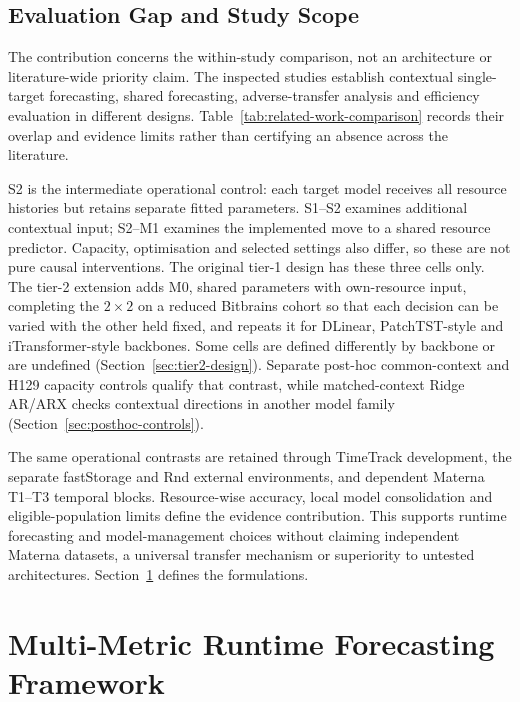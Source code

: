 \documentclass[a4paper,fleqn]{cas-dc}
\begin{document}
\subsection{Evaluation Gap and Study Scope}
\label{sec:rw-gap}

The contribution concerns the within-study comparison, not an architecture
or literature-wide priority claim. The inspected studies establish contextual
single-target forecasting, shared forecasting, adverse-transfer analysis and
efficiency evaluation in different designs. Table~\ref{tab:related-work-comparison}
records their overlap and evidence limits rather than certifying an absence
across the literature.



S2 is the intermediate operational control: each target model receives all
resource histories but retains separate fitted parameters. S1--S2 examines
additional contextual input; S2--M1 examines the implemented move to a shared
resource predictor. Capacity, optimisation and selected settings also differ,
so these are not pure causal interventions. The original tier-1 design has
these three cells only. The tier-2 extension adds M0, shared parameters with
own-resource input, completing the $2\times2$ on a reduced Bitbrains cohort
so that each decision can be varied with the other held fixed, and repeats
it for DLinear, PatchTST-style and iTransformer-style backbones. Some cells
are defined differently by backbone or are undefined
(Section~\ref{sec:tier2-design}).
Separate post-hoc common-context and H129 capacity controls qualify that
contrast, while matched-context Ridge AR/ARX checks contextual directions in
another model family (Section~\ref{sec:posthoc-controls}).

The same operational contrasts are retained through TimeTrack development,
the separate fastStorage and Rnd external environments, and dependent Materna
T1--T3 temporal blocks. Resource-wise accuracy, local model consolidation and
eligible-population limits define the evidence contribution. This supports
runtime forecasting and model-management choices without claiming independent
Materna datasets, a universal transfer mechanism or superiority to untested
architectures. Section~\ref{sec:framework} defines the formulations.

\section{Multi-Metric Runtime Forecasting Framework}
\label{sec:framework}
\end{document}
